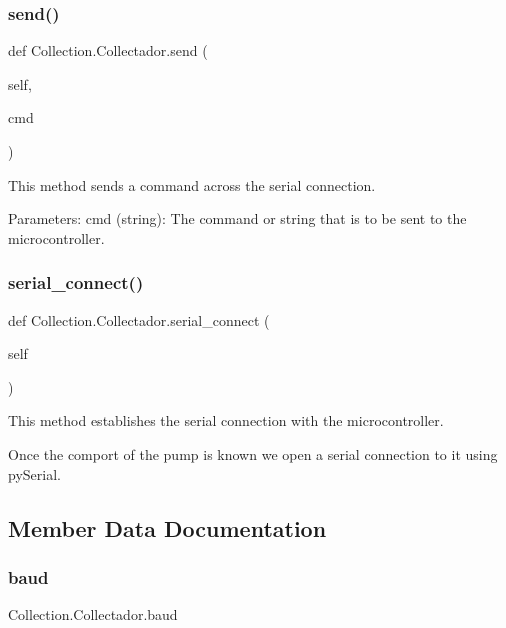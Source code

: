 \subsubsection{\texorpdfstring{send()}{send()}}
{\footnotesize\ttfamily def Collection.\+Collectador.\+send (\begin{DoxyParamCaption}\item[{}]{self,  }\item[{}]{cmd }\end{DoxyParamCaption})}

\begin{DoxyVerb}This method sends a command across the serial connection.

Parameters:
    cmd (string): The command or string that is to be sent to the microcontroller.
\end{DoxyVerb}
 \mbox{\label{class_collection_1_1_collectador_a3d72795fd989947bee15cdd66f277815}} 
\subsubsection{\texorpdfstring{serial\_connect()}{serial\_connect()}}
{\footnotesize\ttfamily def Collection.\+Collectador.\+serial\+\_\+connect (\begin{DoxyParamCaption}\item[{}]{self }\end{DoxyParamCaption})}

\begin{DoxyVerb}This method establishes the serial connection with the microcontroller.

Once the comport of the pump is known we open a serial connection to it using pySerial.
\end{DoxyVerb}
 

\subsection{Member Data Documentation}
\mbox{\label{class_collection_1_1_collectador_a06c835183d4c66cf6c91c2e34ee3e2b6}} 
\subsubsection{\texorpdfstring{baud}{baud}}
{\footnotesize\ttfamily Collection.\+Collectador.\+baud}

